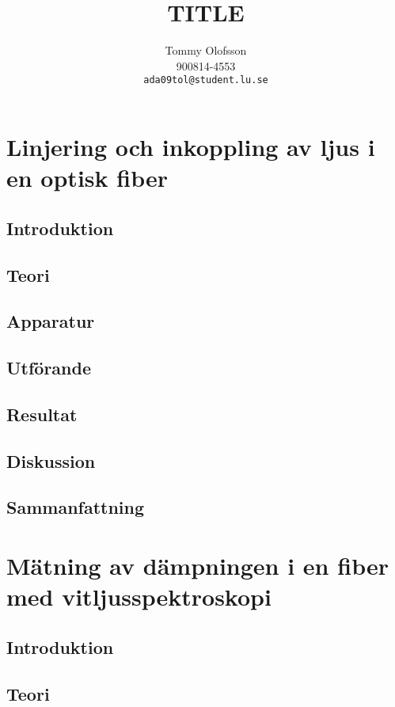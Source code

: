 \documentclass[10pt, a4paper]{article}
\title{TITLE}
\date{}
\author{Tommy Olofsson\\
  900814-4553\\
  \texttt{ada09tol@student.lu.se}}
\begin{document}
\begin{titlepage}
\maketitle
\begin{center}
\end{center}

\thispagestyle{empty}
\end{titlepage}
\setcounter{page}{2}
\section{Linjering och inkoppling av ljus i en optisk fiber}
\subsection{Introduktion}
\subsection{Teori}
\subsection{Apparatur}
\subsection{Utförande}
\subsection{Resultat}
\subsection{Diskussion}
\subsection{Sammanfattning}

\section{Mätning av dämpningen i en fiber med vitljusspektroskopi}
\subsection{Introduktion}
\subsection{Teori}
\end{document}
